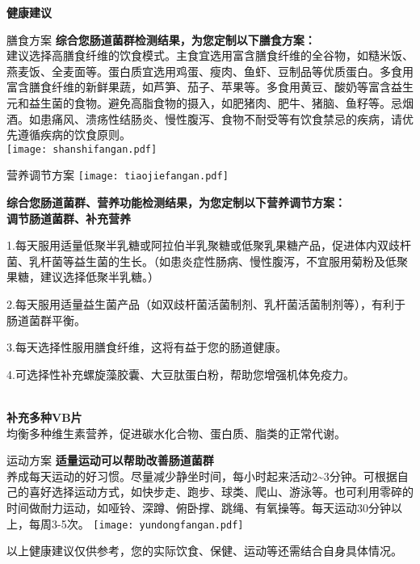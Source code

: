 

\usepackage{graphicx}
\graphicspath{{cores/}}



\vspace*{5mm}
\setlength{\arrayrulewidth}{1pt}
\fontsize{9.3pt}{11pt}\selectfont
\color{gray2}

\centerline{\bf\sanhao 健康建议}

\vspace*{2mm}

\begin{LRaside}[.20]{膳食方案}
{\bf *综合您肠道菌群检测结果，为您定制以下膳食方案：}\\
{\indent 建议选择高膳食纤维的饮食模式。主食宜选用富含膳食纤维的全谷物，如糙米饭、燕麦饭、全麦面等。蛋白质宜选用鸡蛋、瘦肉、鱼虾、豆制品等优质蛋白。多食用富含膳食纤维的新鲜果蔬，如芦笋、茄子、苹果等。多食用黄豆、酸奶等富含益生元和益生菌的食物。避免高脂食物的摄入，如肥猪肉、肥牛、猪脑、鱼籽等。忌烟酒。如患痛风、溃疡性结肠炎、慢性腹泻、食物不耐受等有饮食禁忌的疾病，请优先遵循疾病的饮食原则。}\\
\asidebreak %
\noindent
\texttt{[image: shanshifangan.pdf]}

\end{LRaside}


\begin{LRaside}[.70]{营养调节方案}
\noindent
\texttt{[image: tiaojiefangan.pdf]}

\asidebreak %
{\bf *综合您肠道菌群、营养功能检测结果，为您定制以下营养调节方案：}\\
{\bf 调节肠道菌群、补充营养}\\{\indent 1.每天服用适量低聚半乳糖或阿拉伯半乳聚糖或低聚乳果糖产品，促进体内双歧杆菌、乳杆菌等益生菌的生长。（如患炎症性肠病、慢性腹泻，不宜服用菊粉及低聚果糖，建议选择低聚半乳糖。）

2.每天服用适量益生菌产品（如双歧杆菌活菌制剂、乳杆菌活菌制剂等），有利于肠道菌群平衡。

3.每天选择性服用膳食纤维，这将有益于您的肠道健康。

4.可选择性补充螺旋藻胶囊、大豆肽蛋白粉，帮助您增强机体免疫力。}\\
{\bf 补充多种VB片}\\{\indent 均衡多种维生素营养，促进碳水化合物、蛋白质、脂类的正常代谢。}\\
\end{LRaside}

\begin{LRaside}[.20]{运动方案}
{\bf *适量运动可以帮助改善肠道菌群}\\
{\indent 养成每天运动的好习惯。尽量减少静坐时间，每小时起来活动2\textasciitilde 3分钟。可根据自己的喜好选择运动方式，如快步走、跑步、球类、爬山、游泳等。也可利用零碎的时间做耐力运动，如哑铃、深蹲、俯卧撑、跳绳、有氧操等。每天运动30分钟以上，每周3-5次。}
\asidebreak %
\noindent
\texttt{[image: yundongfangan.pdf]}

\end{LRaside}

{\noindent\qihao *以上健康建议仅供参考，您的实际饮食、保健、运动等还需结合自身具体情况。}


